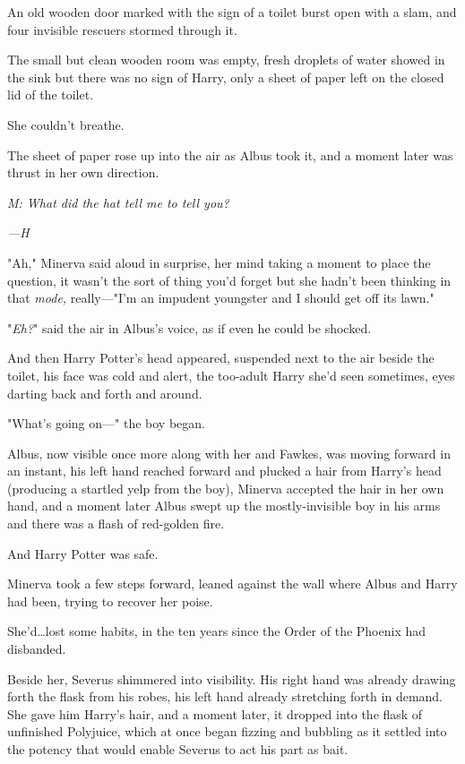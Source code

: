 An old wooden door marked with the sign of a toilet burst open with a slam, and
four invisible rescuers stormed through it.

The small but clean wooden room was empty, fresh droplets of water showed in
the sink but there was no sign of Harry, only a sheet of paper left on the
closed lid of the toilet.

She couldn't breathe.

The sheet of paper rose up into the air as Albus took it, and a moment later
was thrust in her own direction.

\emph{M: What did the hat tell me to tell you?}

\emph{---H}

"Ah," Minerva said aloud in surprise, her mind taking a moment to place the
question, it wasn't the sort of thing you'd forget but she hadn't been thinking
in that \emph{mode,} really---"I'm an impudent youngster and I should get off
its lawn."

"\emph{Eh?}" said the air in Albus's voice, as if even he could be shocked.

And then Harry Potter's head appeared, suspended next to the air beside the
toilet, his face was cold and alert, the too-adult Harry she'd seen sometimes,
eyes darting back and forth and around.

"What's going on---" the boy began.

Albus, now visible once more along with her and Fawkes, was moving forward in
an instant, his left hand reached forward and plucked a hair from Harry's head
(producing a startled yelp from the boy), Minerva accepted the hair in her own
hand, and a moment later Albus swept up the mostly-invisible boy in his arms
and there was a flash of red-golden fire.

And Harry Potter was safe.

Minerva took a few steps forward, leaned against the wall where Albus and Harry
had been, trying to recover her poise.

She'd…lost some habits, in the ten years since the Order of the Phoenix
had disbanded.

Beside her, Severus shimmered into visibility. His right hand was already
drawing forth the flask from his robes, his left hand already stretching forth
in demand. She gave him Harry's hair, and a moment later, it dropped into the
flask of unfinished Polyjuice, which at once began fizzing and bubbling as it
settled into the potency that would enable Severus to act his part as bait.

